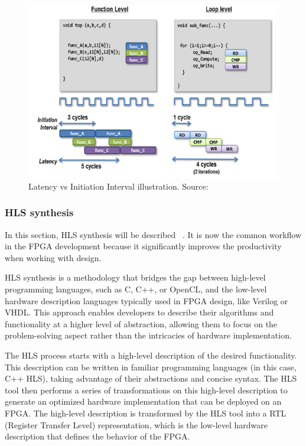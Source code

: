 \documentclass[a4paper, twoside]{report}
\theoremstyle{definition}
\numberwithin{equation}{section}
\begin{document}
\begin{figure}[h!]
    \centering
    \includegraphics[scale=0.7]{iiandlatency.png}
    \caption{Latency vs Initiation Interval illustration. Source: \cite{VitisYork}}
    \label{fig:latency_vs_ii}
\end{figure}

\subsubsection{HLS synthesis} \label{sec:hls_synthesis}

In this section, HLS synthesis will be described ~\cite{AMD2023VitisHLS}.
It is now the common workflow in the FPGA development because it significantly
improves the productivity when working with design.

HLS synthesis is a methodology that bridges the gap between high-level programming
languages, such as C, C++, or OpenCL, and the low-level hardware description languages
typically used in FPGA design, like Verilog or VHDL. This approach enables developers
to describe their algorithms and functionality at a higher level of abstraction,
allowing them to focus on the problem-solving aspect rather than the intricacies of hardware implementation.

The HLS process starts with a high-level description of the desired functionality.
This description can be written in familiar programming languages (in this case, C++ HLS),
taking advantage of their abstractions and concise syntax.
The HLS tool then performs a series of transformations on this high-level description to generate
an optimized hardware implementation that can be deployed on an FPGA.
The high-level description is transformed by the HLS tool into a RTL (Register Transfer Level) representation,
which is the low-level hardware description that defines the behavior of the FPGA.
\end{document}
